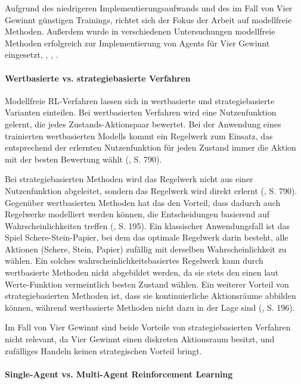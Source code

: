 Aufgrund des niedrigeren Implementierungsaufwands und des im Fall von Vier Gewinnt günstigen Trainings, richtet sich der Fokus der Arbeit auf modellfreie Methoden. Außerdem wurde in verschiedenen Untersuchungen modellfreie Methoden erfolgreich zur Implementierung von Agents für Vier Gewinnt eingesetzt, \cite{Taylor.2024}, \cite{Dabas.2022}, \cite{Wäldchen.2022}.

\paragraph{Wertbasierte vs. strategiebasierte Verfahren}

Modellfreie RL-Verfahren lassen sich in wertbasierte und strategiebasierte Varianten einteilen. Bei wertbasierten Verfahren wird eine Nutzenfunktion gelernt, die jedes Zustands-Aktionspaar bewertet. Bei der Anwendung eines trainierten wertbasierten Modells kommt ein Regelwerk zum Einsatz, das entsprechend der erlernten Nutzenfunktion für jeden Zustand immer die Aktion mit der besten Bewertung wählt (\cite{Russell.2020}, S. 790).

Bei strategiebasierten Methoden wird das Regelwerk nicht aus einer Nutzenfunktion abgeleitet, sondern das Regelwerk wird direkt erlernt (\cite{Russell.2020}, S. 790). Gegenüber wertbasierten Methoden hat das den Vorteil, dass dadurch auch Regelwerke modelliert werden können, die Entscheidungen basierend auf Wahrscheinlichkeiten treffen (\cite{Albrecht.2024}, S. 195). Ein klassischer Anwendungsfall ist das Spiel Schere-Stein-Papier, bei dem das optimale Regelwerk darin besteht, alle Aktionen (Schere, Stein, Papier) zufällig mit derselben Wahrscheinlichkeit zu wählen. Ein solches wahrscheinlichkeitsbasiertes Regelwerk kann durch wertbasierte Methoden nicht abgebildet werden, da sie stets den einen laut Werte-Funktion vermeintlich besten Zustand wählen. Ein weiterer Vorteil von strategiebasierten Methoden ist, dass sie kontinuierliche Aktionsräume abbilden können, während wertbasierte Methoden nicht dazu in der Lage sind (\cite{Albrecht.2024}, S. 196).

Im Fall von Vier Gewinnt sind beide Vorteile von strategiebasierten Verfahren nicht relevant, da Vier Gewinnt einen diskreten Aktionsraum besitzt, und zufälliges Handeln keinen strategischen Vorteil bringt.

\paragraph{Single-Agent vs. Multi-Agent Reinforcement Learning}

